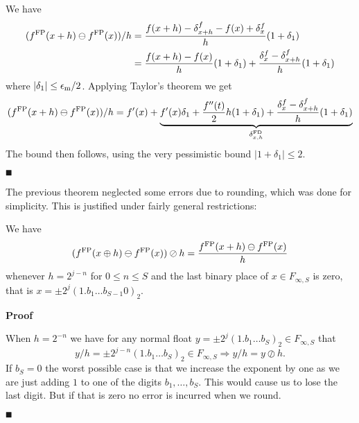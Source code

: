 We have
\begin{align*}
(f^{\rm FP}(x + h) \ensuremath{\ominus} f^{\rm FP}(x)) / h &= {f(x + h) -  \ensuremath{\delta}^f_{x+h} - f(x) + \ensuremath{\delta}^f_x \over h} (1 + \ensuremath{\delta}_1) \\
&= {f(x+h) - f(x) \over h} (1 + \ensuremath{\delta}_1) + { \ensuremath{\delta}^f_x - \ensuremath{\delta}^f_{x+h} \over h} (1 + \ensuremath{\delta}_1)
\end{align*}
where $|\ensuremath{\delta}_1| \ensuremath{\leq} {\ensuremath{\epsilon}_{\rm m} / 2}$. Applying Taylor's theorem we get
\[
(f^{\rm FP}(x + h) \ensuremath{\ominus} f^{\rm FP}(x)) / h = f'(x) + \underbrace{f'(x) \ensuremath{\delta}_1 + {f''(t) \over 2} h (1 + \delta_1) + {\ensuremath{\delta}^f_x  - \ensuremath{\delta}^f_{x+h}\over h} (1 + \ensuremath{\delta}_1)}_{\ensuremath{\delta}_{x,h}^{\rm FD}}
\]
The bound then follows, using the very pessimistic bound $|1 + \ensuremath{\delta}_1| \ensuremath{\leq} 2$.

\ensuremath{\QED}

The previous theorem neglected some errors due to rounding, which was done for simplicity. This is justified under fairly general restrictions:

\begin{corollary} We have
\[
(f^{\rm FP}(x \ensuremath{\oplus} h) \ensuremath{\ominus} f^{\rm FP}(x)) \ensuremath{\oslash} h = {f^{\rm FP}(x + h) \ensuremath{\ominus} f^{\rm FP}(x) \over h}
\]
whenever  $h = 2^{j-n}$ for $0 \ensuremath{\leq} n \ensuremath{\leq} S$ and the last binary place of $x \ensuremath{\in} F_{\ensuremath{\infty},S}$ is zero, that is $x = \ensuremath{\pm}2^j (1.b_1\ensuremath{\ldots}b_{S-1}0)_2$.

\end{corollary}
\textbf{Proof}

When $h = 2^{-n}$ we have for any normal float $y = \ensuremath{\pm}2^j (1.b_1\ensuremath{\ldots}b_S)_2 \ensuremath{\in} F_{\ensuremath{\infty},S}$ that 
\[
y/h = \ensuremath{\pm}2^{j-n} (1.b_1\ensuremath{\ldots}b_S)_2 \ensuremath{\in} F_{\ensuremath{\infty},S} \ensuremath{\Rightarrow} y/h = y \ensuremath{\oslash} h.
\]
If $b_S = 0$ the worst possible case is that we increase the exponent by one as we are just adding $1$ to one of the digits $b_1,\ensuremath{\ldots},b_S$. This would cause us to lose the last digit. But if that is zero no error is incurred when we round.

\ensuremath{\QED}

